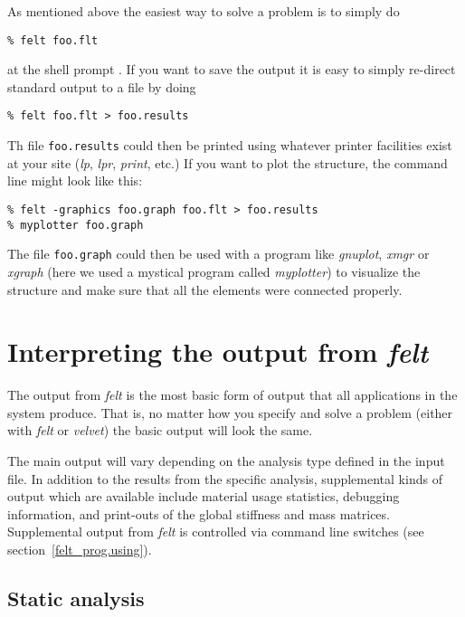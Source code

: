As mentioned above the easiest way to solve a problem is to simply do 
\begin{screen}
 \begin{verbatim}
% felt foo.flt
 \end{verbatim}
\end{screen}
at the shell prompt .  If you want to save the output it is easy to simply 
re-direct standard output to a file by doing 
\begin{screen}
 \begin{verbatim}
% felt foo.flt > foo.results
 \end{verbatim}
\end{screen}
Th file {\tt foo.results} could then be printed using whatever printer 
facilities exist at your site ({\em lp}, {\em lpr}, {\em print}, 
etc.)  If you want to plot 
the structure, the command line might look like this: 
\begin{screen}
 \begin{verbatim}
% felt -graphics foo.graph foo.flt > foo.results
% myplotter foo.graph
 \end{verbatim}
\end{screen}
The file {\tt foo.graph} could then be used with a program like {\em gnuplot}, 
{\em xmgr} or {\em xgraph}
(here we used a mystical program called {\em myplotter}) to visualize the 
structure and make sure that all the elements were connected properly.

\section{Interpreting the output from {\em felt}}
\label{felt_prog.output}

The output from {\em felt} is the most basic form of output that all 
applications in the \felt{} system produce.  That is, no matter how you specify
and solve a \felt{} problem (either with {\em felt} or 
{\em velvet}) the basic output will look the same.  

The main output will vary depending on the analysis type defined in the input
file.  In addition to the results from the specific analysis,
supplemental kinds of output which are available include material usage 
statistics, debugging information, and print-outs of the global stiffness and 
mass matrices.  Supplemental output from {\em felt} is controlled
via command line switches (see section~\ref{felt_prog.using}).

\subsection{Static analysis}

